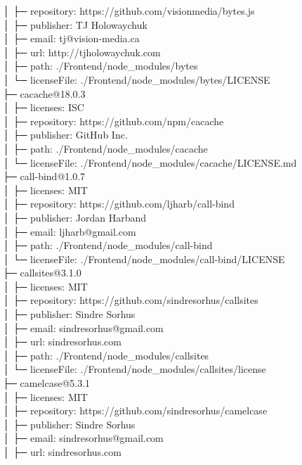 │  ├─ repository: https://github.com/visionmedia/bytes.js\\
│  ├─ publisher: TJ Holowaychuk\\
│  ├─ email: tj@vision-media.ca\\
│  ├─ url: http://tjholowaychuk.com\\
│  ├─ path: ./Frontend/node\_modules/bytes\\
│  └─ licenseFile: ./Frontend/node\_modules/bytes/LICENSE\\
├─ cacache@18.0.3\\
│  ├─ licenses: ISC\\
│  ├─ repository: https://github.com/npm/cacache\\
│  ├─ publisher: GitHub Inc.\\
│  ├─ path: ./Frontend/node\_modules/cacache\\
│  └─ licenseFile: ./Frontend/node\_modules/cacache/LICENSE.md\\
├─ call-bind@1.0.7\\
│  ├─ licenses: MIT\\
│  ├─ repository: https://github.com/ljharb/call-bind\\
│  ├─ publisher: Jordan Harband\\
│  ├─ email: ljharb@gmail.com\\
│  ├─ path: ./Frontend/node\_modules/call-bind\\
│  └─ licenseFile: ./Frontend/node\_modules/call-bind/LICENSE\\
├─ callsites@3.1.0\\
│  ├─ licenses: MIT\\
│  ├─ repository: https://github.com/sindresorhus/callsites\\
│  ├─ publisher: Sindre Sorhus\\
│  ├─ email: sindresorhus@gmail.com\\
│  ├─ url: sindresorhus.com\\
│  ├─ path: ./Frontend/node\_modules/callsites\\
│  └─ licenseFile: ./Frontend/node\_modules/callsites/license\\
├─ camelcase@5.3.1\\
│  ├─ licenses: MIT\\
│  ├─ repository: https://github.com/sindresorhus/camelcase\\
│  ├─ publisher: Sindre Sorhus\\
│  ├─ email: sindresorhus@gmail.com\\
│  ├─ url: sindresorhus.com\\
